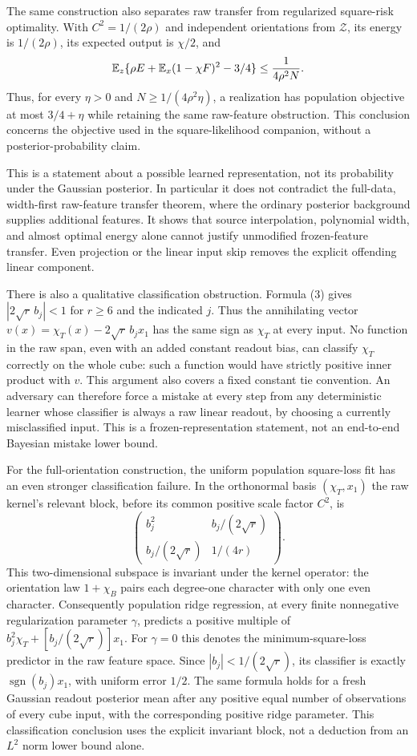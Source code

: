The same construction also separates raw transfer from regularized
square-risk optimality. With $C^2=1/(2\rho)$ and independent orientations
from $\mathcal Z$, its energy is $1/(2\rho)$, its expected output is
$\chi/2$, and
\[
 \mathbb E_z\{\rho E+\mathbb E_x(1-\chi F)^2-3/4\}
                         \le\frac1{4\rho^2N}.
\]
Thus, for every $\eta>0$ and $N\ge1/(4\rho^2\eta)$, a realization
has population objective at most $3/4+\eta$ while retaining the same
raw-feature obstruction. This conclusion concerns the objective used in
the square-likelihood companion, without a posterior-probability claim.

This is a statement about a possible learned representation, not its
probability under the Gaussian posterior. In particular it does not
contradict the full-data, width-first raw-feature transfer theorem,
where the ordinary posterior background supplies additional features.
It shows that source interpolation, polynomial width, and almost optimal
energy alone cannot justify unmodified frozen-feature transfer.
Even projection or the linear input skip removes the explicit offending
linear component.

There is also a qualitative classification obstruction. Formula (3)
gives $|2\sqrt r\,b_j|<1$ for $r\ge6$ and the indicated $j$.
Thus the annihilating vector
$v(x)=\chi_T(x)-2\sqrt r\,b_jx_1$ has the same sign as $\chi_T$ at
every input. No function in the raw span, even with an added constant
readout bias, can classify $\chi_T$ correctly on the whole cube: such a
function would have strictly positive inner product with $v$. This
argument also covers a fixed constant tie convention. An adversary can
therefore force a mistake at every step from any deterministic learner
whose classifier is always a raw linear readout, by choosing a currently
misclassified input. This is a frozen-representation statement, not an
end-to-end Bayesian mistake lower bound.

For the full-orientation construction, the uniform population square-loss
fit has an even stronger classification failure. In the orthonormal basis
$(\chi_T,x_1)$ the raw kernel's relevant block, before its common positive
scale factor $C^2$, is
\[
 \begin{pmatrix}b_j^2&b_j/(2\sqrt r)\\
                 b_j/(2\sqrt r)&1/(4r)\end{pmatrix}.
\]
This two-dimensional subspace is invariant under the kernel operator:
the orientation law $1+\chi_B$ pairs each degree-one character with only
one even character. Consequently population ridge regression, at every
finite nonnegative regularization parameter $\gamma$, predicts a positive
multiple of
$b_j^2\chi_T+[b_j/(2\sqrt r)]x_1$.
For $\gamma=0$ this denotes the minimum-square-loss predictor in the raw
feature space. Since $|b_j|<1/(2\sqrt r)$, its classifier is exactly
$\operatorname{sgn}(b_j)x_1$, with uniform error $1/2$.
The same formula holds for a fresh Gaussian readout posterior mean after
any positive equal number of observations of every cube input, with the
corresponding positive ridge parameter. This classification conclusion
uses the explicit invariant block, not a deduction from an $L^2$ norm
lower bound alone.

